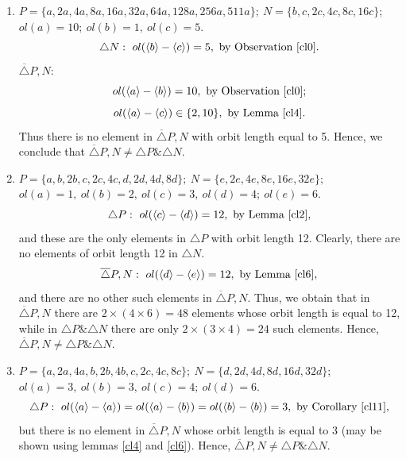 {{{\begin{enumerate}
  \item  $ P=\{a,2a,4a,8a,16a,32a,64a,128a,256a,511a\}; \  N=\{b,c,2c,4c,8c,16c\} $; \\  
	 $ ol(a)=10; \ ol(b)=1, \  ol(c)=5 $.\\  
	 $$\triangle N: \ 
	 ol(\langle b \rangle - \langle c \rangle)=5, \mbox{ by Observation \ref{cl0}}.$$
	 $ \overline{\triangle} P,N $: 
	 $$ ol(\langle a \rangle - \langle b \rangle)=10, \mbox{ by Observation \ref{cl0}} ;$$
	 $$ ol(\langle a \rangle - \langle c \rangle) \in \{2,10\}, \mbox{ by Lemma \ref{cl4}}.$$
	 Thus there is no element in $ \overline{\triangle} P,N $ with orbit length equal to 5.
	 Hence, we conclude that $ \overline{\triangle} P,N  \neq \triangle P \& \triangle N $.
 
  \item  $ P=\{a,b,2b,c,2c,4c,d,2d,4d,8d\}; \  N=\{e,2e,4e,8e,16e,32e\}; $ \\  
	 $ ol(a)=1, \ ol(b)=2, \  ol(c)=3, \  ol(d)=4; \  ol(e)=6 $.\\
	 $$\triangle P: \ ol(\langle c \rangle - \langle d \rangle)=12, \mbox{ by Lemma \ref{cl2}},$$  
	 and these are the only elements in $\triangle P$ with orbit length 12. 
	 Clearly, there are no elements of orbit length 12 in $\triangle N$. 
	 $$ \overline{\triangle} P,N: \ 
	  ol(\langle d \rangle - \langle e \rangle)=12 , \mbox{ by Lemma \ref{cl6}},$$
	 and there are no other                  
	 such elements in $\overline{\triangle}P,N$. Thus, we obtain that 
	 in $ \overline{\triangle} P,N $ there are $ 2 \times (4 \times 6)=48 $ elements
	 whose orbit length is equal to 12, while in $\triangle P \& \triangle N $
	 there are only $2 \times (3 \times 4)=24$ such elements. Hence, \- 
	 $ \overline{\triangle} P,N \neq \triangle P \& \triangle N $.
  
  \item  $ P=\{a,2a,4a,b,2b,4b,c,2c,4c,8c\}; \  N=\{d,2d,4d,8d,16d,32d\} $; \\  
	 $ ol(a)=3, \ ol(b)=3, \  ol(c)=4; \  ol(d)=6 $.\\
	 $$\triangle P : \ ol(\langle a \rangle - \langle a \rangle)=ol(\langle a \rangle - \langle b \rangle)=ol(\langle b \rangle - \langle b \rangle)=3, \mbox{ by Corollary \ref{cl11}},$$
	 but there is no element in $ \overline{\triangle} P,N$ whose orbit length is
	 equal to 3 (may be shown using lemmas \ref{cl4} and \ref{cl6}). Hence, $ \overline{\triangle} P,N \neq \triangle P \& \triangle N $.
  

\end{enumerate}}}}
